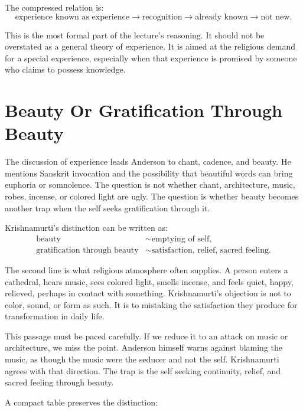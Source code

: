 The compressed relation is:
\begin{equation}
\text{experience known as experience}
\longrightarrow
\text{recognition}
\longrightarrow
\text{already known}
\longrightarrow
\text{not new}.
\end{equation}

This is the most formal part of the lecture's reasoning. It should not be overstated as a general theory of experience. It is aimed at the religious demand for a special experience, especially when that experience is promised by someone who claims to possess knowledge.

\section{Beauty Or Gratification Through Beauty}

The discussion of experience leads Anderson to chant, cadence, and beauty. He mentions Sanskrit invocation and the possibility that beautiful words can bring euphoria or somnolence. The question is not whether chant, architecture, music, robes, incense, or colored light are ugly. The question is whether beauty becomes another trap when the self seeks gratification through it.

Krishnamurti's distinction can be written as:
\begin{align}
\text{beauty}
&\sim
\text{emptying of self},\\
\text{gratification through beauty}
&\sim
\text{satisfaction, relief, sacred feeling}.
\end{align}

The second line is what religious atmosphere often supplies. A person enters a cathedral, hears music, sees colored light, smells incense, and feels quiet, happy, relieved, perhaps in contact with something. Krishnamurti's objection is not to color, sound, or form as such. It is to mistaking the satisfaction they produce for transformation in daily life.

This passage must be paced carefully. If we reduce it to an attack on music or architecture, we miss the point. Anderson himself warns against blaming the music, as though the music were the seducer and not the self. Krishnamurti agrees with that direction. The trap is the self seeking continuity, relief, and sacred feeling through beauty.

A compact table preserves the distinction:

